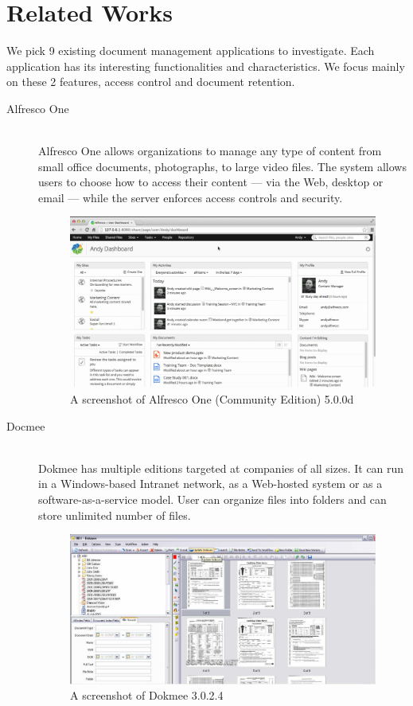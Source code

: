 \section{Related Works} \label{relate-works}
We pick 9 existing document management applications to investigate.
Each application has its interesting functionalities and characteristics.
We focus mainly on these 2 features, access control and document retention.
\begin{description}
\item[Alfresco One] \hfill \\
Alfresco One allows organizations to manage any type of content from small office documents, photographs, to large video files.
The system allows users to choose how to access their content --- via the Web, desktop or email --- while the server enforces access controls and security.
\begin{figure}[h]
	\centering
	\includegraphics[scale=0.4]{res/literature/screenshot_alfresco}
	\caption{A screenshot of Alfresco One (Community Edition) 5.0.0d \cite{alfresco}}
\end{figure}

\item[Docmee] \hfill \\
Dokmee has multiple editions targeted at companies of all sizes.
It can run in a Windows-based Intranet network, as a Web-hosted system or as a software-as-a-service model.
User can organize files into folders and can store unlimited number of files.
\begin{figure}[h]
	\centering
	\includegraphics[scale=0.55]{res/literature/screenshot_dokmee}
	\caption{A screenshot of Dokmee 3.0.2.4 \cite{dokmee}}
\end{figure}


\end{description}
